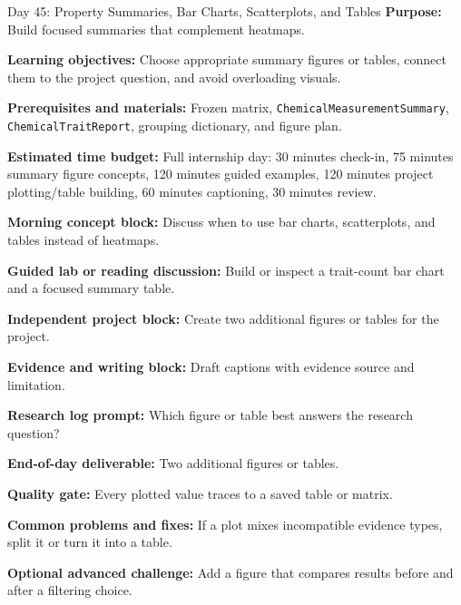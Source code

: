 \begin{dailybox}{Day 45: Property Summaries, Bar Charts, Scatterplots, and Tables}
\textbf{Purpose:} Build focused summaries that complement heatmaps.

\textbf{Learning objectives:} Choose appropriate summary figures or tables, connect them to the project question, and avoid overloading visuals.

\textbf{Prerequisites and materials:} Frozen matrix, \texttt{ChemicalMeasurementSummary}, \texttt{ChemicalTraitReport}, grouping dictionary, and figure plan.

\textbf{Estimated time budget:} Full internship day: 30 minutes check-in, 75 minutes summary figure concepts, 120 minutes guided examples, 120 minutes project plotting/table building, 60 minutes captioning, 30 minutes review.

\textbf{Morning concept block:} Discuss when to use bar charts, scatterplots, and tables instead of heatmaps.

\textbf{Guided lab or reading discussion:} Build or inspect a trait-count bar chart and a focused summary table.

\textbf{Independent project block:} Create two additional figures or tables for the project.

\textbf{Evidence and writing block:} Draft captions with evidence source and limitation.

\textbf{Research log prompt:} Which figure or table best answers the research question?

\textbf{End-of-day deliverable:} Two additional figures or tables.

\textbf{Quality gate:} Every plotted value traces to a saved table or matrix.

\textbf{Common problems and fixes:} If a plot mixes incompatible evidence types, split it or turn it into a table.

\textbf{Optional advanced challenge:} Add a figure that compares results before and after a filtering choice.
\end{dailybox}

